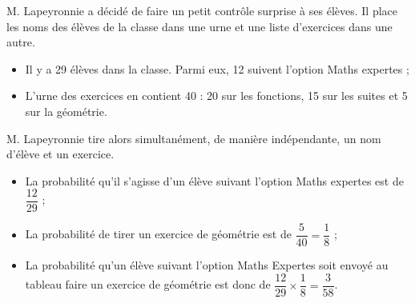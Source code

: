 \documentclass[11pt,fleqn, openany]{book} %
\begin{document}
\begin{example}M. Lapeyronnie a décidé de faire un petit contrôle surprise à ses élèves. Il place les noms des élèves de la classe dans une urne et une liste d'exercices dans une autre. 
\begin{itemize}
\item Il y a 29 élèves dans la classe. Parmi eux, 12 suivent l'option Maths expertes ;
\item L'urne des exercices en contient 40 : 20 sur les fonctions, 15 sur les suites et 5 sur la géométrie.
\end{itemize}
M. Lapeyronnie tire alors simultanément, de manière indépendante, un nom d'élève et un exercice.

\begin{itemize}
\item La probabilité qu'il s'agisse d'un élève suivant l'option Maths expertes est de $\dfrac{12}{29}$ ;
\vskip10pt
\item La probabilité de tirer un exercice de géométrie est de $\dfrac{5}{40}=\dfrac{1}{8}$ ;
\vskip10pt
\item La probabilité qu'un élève suivant l'option Maths Expertes soit envoyé au tableau faire un exercice de géométrie est donc de $\dfrac{12}{29} \times \dfrac{1}{8} = \dfrac{3}{58}$.
\end{itemize}
\end{example}
\end{document}
